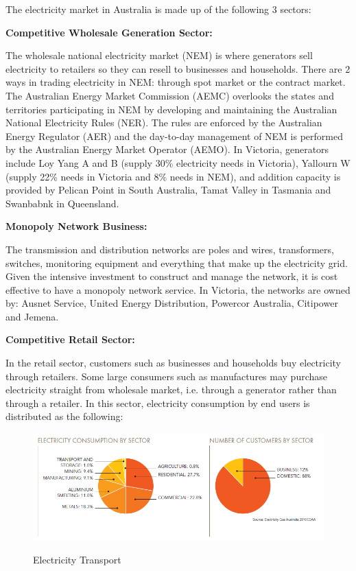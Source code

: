 \documentclass[12pt]{article}
\begin{document}
\begin{flushleft}
The electricity market in Australia is made up of the following 3 sectors:\par
{\textbf{\large Competitive Wholesale Generation Sector:}}\par
The wholesale national electricity market (NEM) is where generators sell electricity to retailers so they can resell to businesses and households. There are 2 ways in trading electricity in NEM: through spot market or the contract market.\parencite{aemc2} The Australian Energy Market Commission (AEMC) overlooks the states and territories participating in NEM by developing and maintaining the Australian National Electricity Rules (NER). The rules are enforced by the Australian Energy Regulator (AER) and the day-to-day management of NEM is performed by the Australian Energy Market Operator (AEMO).\parencite{aemo1} In Victoria, generators include Loy Yang A and B (supply 30\% electricity needs in Victoria), Yallourn W (supply 22\% needs in Victoria and 8\% needs in NEM), and addition capacity is provided by Pelican Point in South Australia, Tamat Valley in Tasmania and Swanbabnk in Queensland. \par
{\textbf{\large Monopoly Network Business:}}\par
The transmission and distribution networks are poles and wires, transformers, switches, monitoring equipment and everything that make up the electricity grid. Given the intensive investment to construct and manage the network, it is cost effective to have a monopoly network service.\parencite{aemc2} In Victoria, the networks are owned by: Ausnet Service, United Energy Distribution, Powercor Australia, Citipower and Jemena.\par
{\textbf{\large Competitive Retail Sector:}}\par
In the retail sector, customers such as businesses and households buy electricity through retailers. Some large consumers such as manufactures may purchase electricity straight from wholesale market, i.e. through a generator rather than through a retailer.\parencite{aemc2} In this sector, electricity consumption by end users is distributed as the following:
\begin{figure}[!h]
  \centering
  \includegraphics[width=\textwidth]{electricity_consumption.PNG}
    \caption{Electricity Transport}
    \parencite{aemo2}
\end{figure}
\end{flushleft}
\newpage
\end{document}

